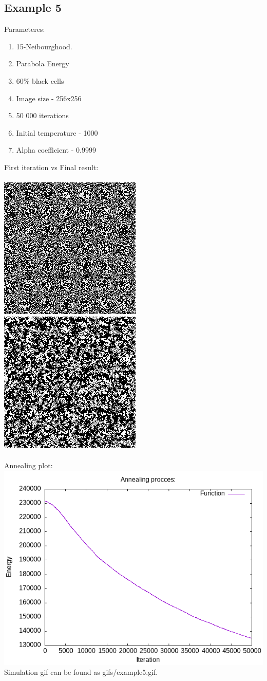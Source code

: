 \documentclass{article}
\begin{document}
\subsection*{Example 5}
Parameteres:
\begin{enumerate}
    \item 15-Neibourghood.
    \item Parabola Energy
    \item 60\% black cells
    \item Image size - 256x256
    \item 50 000 iterations
    \item Initial temperature - 1000
    \item Alpha coefficient - 0.9999
\end{enumerate}
First iteration vs Final result:
\\\\
\includegraphics*[width = 0.4\linewidth ]{output/sixth/first_iter.png}
\includegraphics*[width = 0.4\linewidth ]{output/sixth/final_result.png}
\\\\
Annealing plot:
\\
\includegraphics*[width = 0.8\linewidth ]{output/sixth/annealing_plot.png}
\\
Simulation gif can be found as gifs/example5.gif. 
\end{document}
